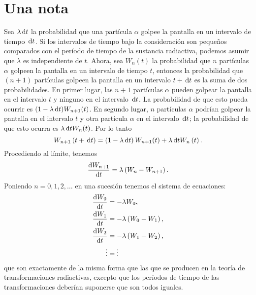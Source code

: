 \section{Una nota}
\label{sec:note}

Sea $\lambda\dl t$ la probabilidad que una partícula $\alpha$ golpee la pantalla en un intervalo de tiempo $\dl t$. Si los intervalos de tiempo bajo la consideración son pequeños comparados con el período de tiempo de la sustancia radiactiva, podemos asumir que $\lambda$ es independiente de $t$. Ahora, sea $W_n(t)$ la probabilidad que $n$ partículas $\alpha$ golpeen la pantalla en un intervalo de tiempo $t$, entonces la probabilidad que $(n+1)$ partículas golpeen la pantalla en un intervalo $t+\dl t$ es la suma de dos probabilidades. En primer lugar, las $n+1$ partículas $\alpha$ pueden golpear la pantalla en el intervalo $t$ y ninguno en el intervalo $\dl t$. La probabilidad de que esto pueda ocurrir es $(1-\lambda\dl t)W_{n+1}(t)$. En segundo lugar, $n$ partículas $\alpha$ podrían golpear la pantalla en el intervalo $t$ y otra partícula $\alpha$ en el intervalo $\dl t$; la probabilidad de que esto ocurra es $\lambda\dl t W_n(t)$. Por lo tanto
\begin{equation*}
	W_{n+1}\left(t+\dl t\right)=\left(1-\lambda\dl t\right)W_{n+1}(t)+\lambda\dl t W_n\left(t\right).
\end{equation*}
Procediendo al límite, tenemos
\begin{equation*}
	\diff{W_{n+1}}{t}=\lambda\left(W_n-W_{n+1}\right).
\end{equation*}
Poniendo $n=0,1,2,\ldots$ en una sucesión tenemos el sistema de ecuaciones:
\begin{align*}
	\diff{W_0}{t}&=-\lambda W_0,\\
	\diff{W_1}{t}&=-\lambda\left(W_0-W_1\right),\\
	\diff{W_2}{t}&=-\lambda\left(W_1-W_2\right),\\
	\vdots &=\vdots\\	%
\end{align*}
que son exactamente de la misma forma que las que se producen en la teoría de transformaciones radiactivas, excepto que los períodos de tiempo de las transformaciones deberían suponerse que son todos iguales.

